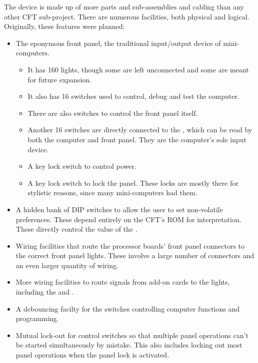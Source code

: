 The device is made up of more parts and sub-assemblies and cabling
than any other CFT sub-project. There are numerous facilities, both
physical and logical. Originally, these features were planned:

\begin{itemize}

\item The eponymous front panel, the traditional input/output device
  of mini-computers.
  \begin{itemize}
  \item It has 160 lights, though some are left
    unconnected and some are meant for future expansion.
  \item It also has 16 switches used to control, debug and test the computer.
  \item There are also switches to control the front panel itself.
  \item Another 16 switches are directly connected to the ,
    which can be read by both the computer and front panel. They are
    the computer's sole input device.
  \item A key lock switch to control power.
  \item A key lock switch to lock the panel. These locks are mostly
    there for stylistic reasons, since many mini-computers had them.
  \end{itemize}

\item A hidden bank of DIP switches to allow the user to set
  non-volatile preferences. These depend entirely on the CFT's ROM for
  interpretation. These directly control the value of the .

\item Wiring facilities that route the processor boards' front panel
  connectors to the correct front panel lights. These involve a
  large number of connectors and an even larger quantity of wiring.
  
\item More wiring facilities to route signals from add-on cards to
  the lights, including the  and .

\item A debouncing facilty for the switches controlling computer
  functions and programming.

\item Mutual lock-out for control switches so that multiple panel
  operations can't be started simultaneously by mistake. This also
  includes locking out most panel operations when the panel lock is
  activated.


\end{itemize}
